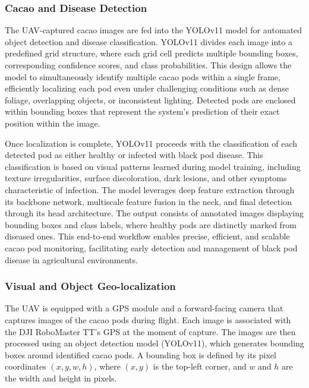 \subsubsection*{Cacao and Disease Detection}

The UAV-captured cacao images are fed into the YOLOv11 model for automated object detection and disease classification. YOLOv11 divides each image into a predefined grid structure, where each grid cell predicts multiple bounding boxes, corresponding confidence scores, and class probabilities. This design allows the model to simultaneously identify multiple cacao pods within a single frame, efficiently localizing each pod even under challenging conditions such as dense foliage, overlapping objects, or inconsistent lighting. Detected pods are enclosed within bounding boxes that represent the system’s prediction of their exact position within the image.

Once localization is complete, YOLOv11 proceeds with the classification of each detected pod as either healthy or infected with black pod disease. This classification is based on visual patterns learned during model training, including texture irregularities, surface discoloration, dark lesions, and other symptoms characteristic of infection. The model leverages deep feature extraction through its backbone network, multiscale feature fusion in the neck, and final detection through its head architecture. The output consists of annotated images displaying bounding boxes and class labels, where healthy pods are distinctly marked from diseased ones. This end-to-end workflow enables precise, efficient, and scalable cacao pod monitoring, facilitating early detection and management of black pod disease in agricultural environments.


\subsubsection*{Visual and Object Geo-localization}

The UAV is equipped with a GPS module and a forward-facing camera that captures images of the cacao pods during flight. Each image is associated with the DJI RoboMaster TT’s GPS at the moment of capture. The images are then processed using an object detection model (YOLOv11), which generates bounding boxes around identified cacao pods. A bounding box is defined by its pixel coordinates $(x, y, w, h)$, where $(x, y)$ is the top-left corner, and $w$ and $h$ are the width and height in pixels.

